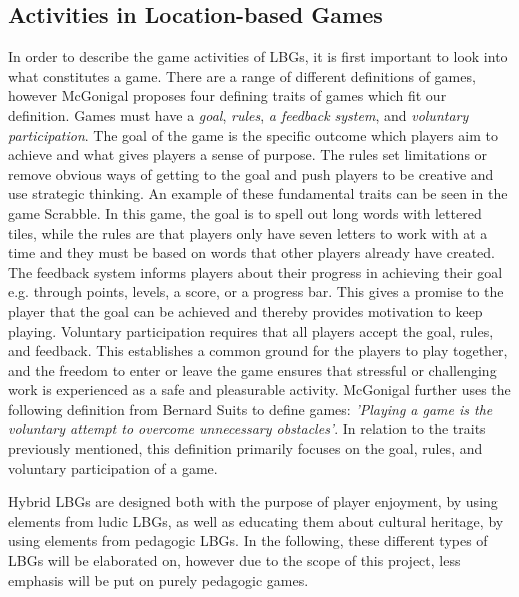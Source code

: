 \subsection{Activities in Location-based Games}
In order to describe the game activities of LBGs, it is first important to look into what constitutes a game. There are a range of different definitions of games, however McGonigal proposes four defining traits of games which fit our definition\cite{RealityIsBroken}. Games must have a \textit{goal}, \textit{rules}, \textit{a feedback system}, and \textit{voluntary participation}. The goal of the game is the specific outcome which players aim to achieve and what gives players a sense of purpose. The rules set limitations or remove obvious ways of getting to the goal and push players to be creative and use strategic thinking. An example of these fundamental traits can be seen in the game Scrabble. In this game, the goal is to spell out long words with lettered tiles, while the rules are that players only have seven letters to work with at a time and they must be based on words that other players already have created. The feedback system informs players about their progress in achieving their goal e.g. through points, levels, a score, or a progress bar. This gives a promise to the player that the goal can be achieved and thereby provides motivation to keep playing. Voluntary participation requires that all players accept the goal, rules, and feedback. This establishes a common ground for the players to play together, and the freedom to enter or leave the game ensures that stressful or challenging work is experienced as a safe and pleasurable activity. McGonigal further uses the following definition from Bernard Suits to define games: \emph{'Playing a game is the voluntary attempt to overcome unnecessary obstacles'}\cite{RealityIsBroken}. In relation to the traits previously mentioned, this definition primarily focuses on the goal, rules, and voluntary participation of a game. 

Hybrid LBGs are designed both with the purpose of player enjoyment, by using elements from ludic LBGs, as well as educating them about cultural heritage, by using elements from pedagogic LBGs\cite{LBG_Review}. In the following, these different types of LBGs will be elaborated on, however due to the scope of this project, less emphasis will be put on purely pedagogic games.

